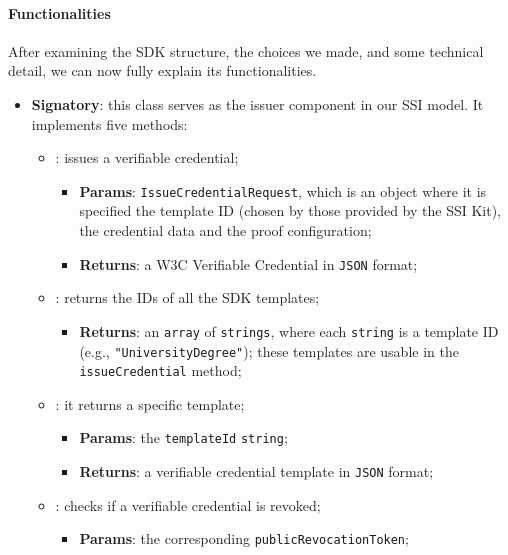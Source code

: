 \paragraph{Functionalities}
After examining the SDK structure, the choices we made, and some technical detail, we can now 
fully explain its functionalities.
\begin{itemize}
    \setlength{\itemsep}{1cm}

    \item \textbf{Signatory}: this class serves as the issuer component in our
    SSI model. It implements five methods:
    \begin{itemize}
        \setlength{\itemsep}{0.4cm}
        \item[] : issues a verifiable credential;
        \begin{itemize}
            \item \textbf{Params}: \texttt{IssueCredentialRequest}, which is an object where 
            it is specified the template ID (chosen by those provided by the SSI Kit), the
            credential data and the proof configuration;
            \item \textbf{Returns}: a W3C Verifiable Credential in \texttt{JSON} format;
        \end{itemize}
        \item[] : returns the IDs of all the SDK templates;
        \begin{itemize}
            \item \textbf{Returns}: an \texttt{array} of \texttt{strings}, where each \texttt{string} is a template ID
            (e.g., \texttt{"UniversityDegree"}); these templates are usable in the
            \texttt{issueCredential} method;
        \end{itemize}
        \item[] : it returns a specific template;
        \begin{itemize}
            \item \textbf{Params}: the \texttt{templateId} \texttt{string};
            \item \textbf{Returns}: a verifiable credential template in \texttt{JSON} format;
        \end{itemize}
        \item[] : checks if a verifiable credential is revoked;
        \label{method:isRevoked}
        \begin{itemize}
            \item \textbf{Params}: the corresponding \texttt{publicRevocationToken};

\end{itemize}
\end{itemize}
\end{itemize}
